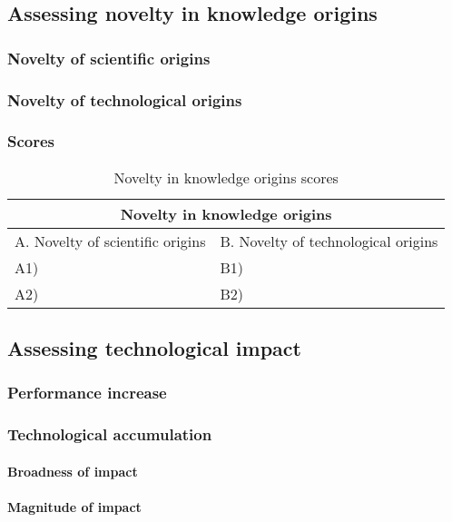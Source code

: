 \subsection{Assessing novelty in knowledge origins}
\subsubsection{Novelty of scientific origins}

\subsubsection{Novelty of technological origins}

\subsubsection{Scores}
\begin{table}[h]
\centering
\begin{tabular}{l l}
\hline
\multicolumn{2}{|c|}{Novelty in knowledge origins} \\
\hline
A. Novelty of scientific origins & B. Novelty of technological origins\\
A1) & B1)\\ 
A2) & B2)\\ 
\hline
\end{tabular}
\caption{Novelty in knowledge origins scores}
\label{tbl:origscores5}
\end{table}

\subsection{Assessing technological impact}
\subsubsection{Performance increase}

\subsubsection{Technological accumulation}
\paragraph{Broadness of impact}

\paragraph{Magnitude of impact}

